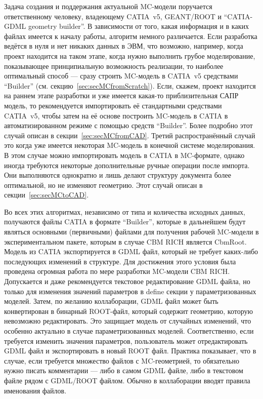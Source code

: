 Задача создания и поддержания актуальной MC-модели поручается ответственному человеку, владеющему CATIA~v5, GEANT/ROOT и ``CATIA-GDML geometry builder''. В зависимости от того, какая информация и в каких файлах имеется к началу работы, алгоритм немного различается.
Если разработка ведётся в нуля и нет никаких данных в ЭВМ, что возможно, например, когда проект находится на таком этапе, когда нужно выполнить грубое моделирование, показывающее принципиальную возможность реализации, то наиболее оптимальный способ --- сразу строить MC-модель в CATIA~v5 средствами ``Builder'' (см. секцию~\ref{sec:secMCfromScratch}).
Если, скажем, проект находится на раннем этапе разработки и уже имеется какая-то приблизительная САПР модель, то рекомендуется импортировать её стандартными средствами CATIA~v5, чтобы затем на её основе построить MC-модель в CATIA в автоматизированном режиме с помощью средств ``Builder''. Более подробно этот случай описан в секции~\ref{sec:secMCfromCAD}.
Третий распространённый случай это когда уже имеется некоторая MC-модель в конечной системе моделирования. В этом случае можно импортировать модель в CATIA в MC-формате, однако иногда требуются некоторые дополнительные ручные операции после импорта. Они выполняются однократно и лишь делают структуру документа более оптимальной, но не изменяют геометрию. Этот случай описан в секции~\ref{sec:secMCtoCAD}.

Во всех этих алгоритмах, независимо от типа и количества исходных данных, получаются файлы CATIA в формате ``Builder'', которые в дальнейшем будут являться основными (первичными) файлами для получения рабочей MC-модели в экспериментальном пакете, которым в случае CBM RICH является CbmRoot. Модель из CATIA экспортируется в GDML файл, который не требует каких-либо последующих изменений в структуре. Для достижения этого условия была проведена огромная работа по мере разработки MC-модели CBM RICH. Допускается и даже рекомендуется текстовое редактирование GDML файла, но только для изменения значений параметров в define секции у параметризованных моделей. Затем, по желанию коллаборации, GDML файл может быть конвертирован в бинарный ROOT-файл, который содержит геометрию, которую невозможно редактировать. Это защищает модель от случайных изменений, что особенно актуально в случае параметризованных моделей. Соответственно, если требуется изменить значения параметров, пользователь может отредактировать GDML файл и экспортировать в новый ROOT файл. Практика показывает, что в случае, если требуется множество файлов с MC-геометрией, то обязательно нужно писать комментарии --- либо в самом GDML файле, либо в текстовом файле рядом с GDML/ROOT файлом. Обычно в коллаборации вводят правила именования файлов.

